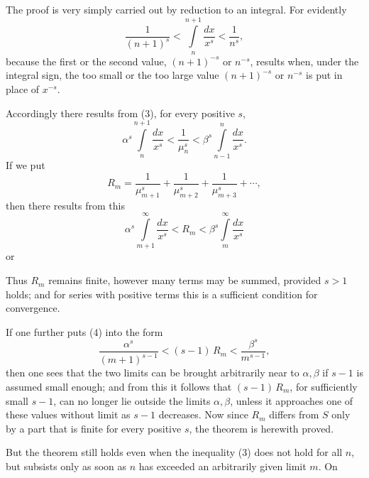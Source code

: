 The proof is very simply carried out by reduction to an integral. For evidently
\[
\frac{1}{(n+1)^s} < \int\limits_n^{n+1} \frac{dx}{x^s} < \frac{1}{n^s},
\]
because the first or the second value, $(n+1)^{-s}$ or $n^{-s}$, results when, under the integral sign, the too small or the too large value $(n+1)^{-s}$ or $n^{-s}$ is put in place of $x^{-s}$.

Accordingly there results from (3), for every positive $s$,
\[
\alpha^s \int\limits_n^{n+1} \frac{dx}{x^s} < \frac{1}{\mu_n^s} < \beta^s \int\limits_{n-1}^n \frac{dx}{x^s}.
\]
If we put
\[
R_m = \frac{1}{\mu_{m+1}^s} + \frac{1}{\mu_{m+2}^s} + \frac{1}{\mu_{m+3}^s} + \cdots,
\]
then there results from this
\[
\alpha^s \int\limits_{m+1}^{\infty} \frac{dx}{x^s} < R_m < \beta^s \int\limits_m^{\infty} \frac{dx}{x^s}
\]
or

Thus $R_m$ remains finite, however many terms may be summed, provided $s > 1$ holds; and for series with positive terms this is a sufficient condition for convergence.

If one further puts (4) into the form
\[
\frac{\alpha^s}{(m+1)^{s-1}} < (s-1)\,R_m < \frac{\beta^s}{m^{s-1}},
\]
then one sees that the two limits can be brought arbitrarily near to $\alpha, \beta$ if $s-1$ is assumed small enough; and from this it follows that $(s-1)\,R_m$, for sufficiently small $s-1$, can no longer lie outside the limits $\alpha, \beta$, unless it approaches one of these values without limit as $s-1$ decreases. Now since $R_m$ differs from $S$ only by a part that is finite for every positive $s$, the theorem is herewith proved.

But the theorem still holds even when the inequality (3) does not hold for all $n$, but subsists only as soon as $n$ has exceeded an arbitrarily given limit $m$. On
